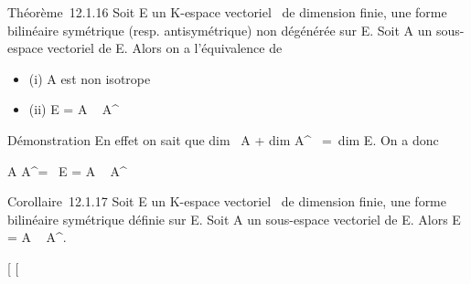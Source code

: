 \documentclass[]{article}
\begin{document}
Théorème~12.1.16 Soit E un K-espace vectoriel ~de dimension finie, \phi une
forme bilinéaire symétrique (resp. antisymétrique) non dégénérée sur E.
Soit A un sous-espace vectoriel de E. Alors on a l'équivalence de

\begin{itemize}
\itemsep1pt\parskip0pt
\item
  (i) A est non isotrope
\item
  (ii) E = A \oplus~ A^\bot
\end{itemize}

Démonstration En effet on sait que dim~ A
+ dim A^\bot~ =\
dim E. On a donc

A \bigcap A^\bot = \0\
\Leftrightarrow E = A \oplus~ A^\bot

Corollaire~12.1.17 Soit E un K-espace vectoriel ~de dimension finie, \phi
une forme bilinéaire symétrique définie sur E. Soit A un sous-espace
vectoriel de E. Alors E = A \oplus~ A^\bot.

{[}
{[}
\end{document}
